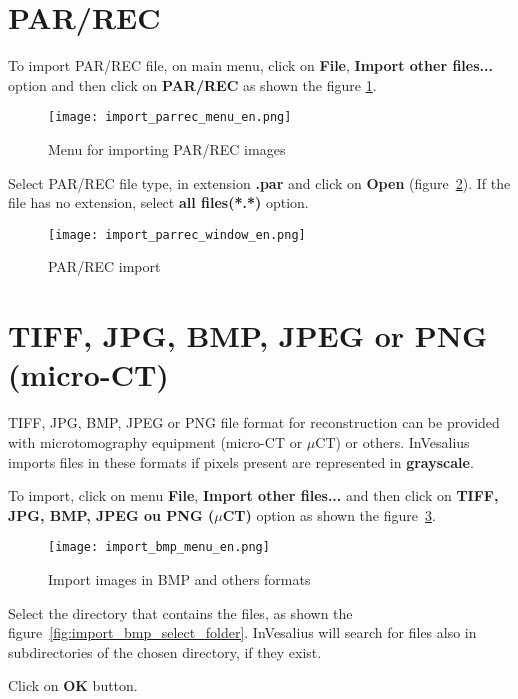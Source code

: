 \section{PAR/REC}

To import PAR/REC file, on main menu, click on \textbf{File}, \textbf{Import other files...} option and then click on \textbf{PAR/REC} as shown the figure \ref{fig:import_parrec_menu_pt}.

\begin{figure}[!htb]
\centering
\texttt{[image: import\_parrec\_menu\_en.png]}
\caption{Menu for importing PAR/REC images}
\label{fig:import_parrec_menu_pt}
\end{figure}

Select PAR/REC file type, in extension \textbf{.par} and click on \textbf{Open} (figure~\ref{fig:import_parrec_window_pt}). If the file has no extension, select \textbf{all files(*.*)} option.

\begin{figure}[!htb]
\centering
\texttt{[image: import\_parrec\_window\_en.png]}
\caption{PAR/REC import}
\label{fig:import_parrec_window_pt}
\end{figure}

\section{TIFF, JPG, BMP, JPEG or PNG (micro-CT)}

TIFF, JPG, BMP, JPEG or PNG file format for reconstruction can be provided with microtomography equipment (micro-CT or $\mu$CT) or others. InVesalius imports files in these formats if pixels present are represented in \textbf{grayscale}.

To import, click on menu \textbf{File}, \textbf{Import other files...} and then click on \textbf{TIFF, JPG, BMP, JPEG ou PNG ($\mu$CT)} option as shown the figure~\ref{fig:import_bmp_menu_pt}.

\begin{figure}[!htb]
\centering
\texttt{[image: import\_bmp\_menu\_en.png]}
\caption{Import images in BMP and others formats}
\label{fig:import_bmp_menu_pt}
\end{figure}

Select the directory that contains the files, as shown the figure~\ref{fig:import_bmp_select_folder}. InVesalius will search for files also in subdirectories of the chosen directory, if they exist. 

Click on \textbf{OK} button.

